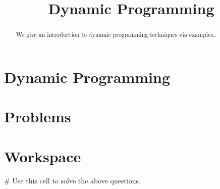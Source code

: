 \documentclass{ximera}
\title{Dynamic Programming}
\begin{document}
  
\begin{abstract}  
We give an introduction to dynamic programming techniques via examples..
\end{abstract}  
\maketitle

\section{Dynamic Programming}



\section{Problems}

\begin{question}
\end{question}

\section{Workspace}

\begin{sageCell}
# Use this cell to solve the above questions.
\end{sageCell}
\end{document}
